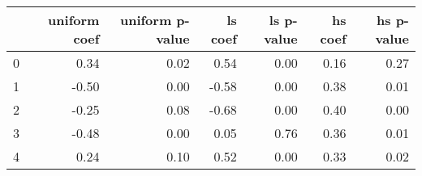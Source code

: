 \begin{tabular}{lrrrrrr}
\toprule
 & uniform coef & uniform p-value & ls coef & ls p-value & hs coef & hs p-value \\
\midrule
0 & 0.34 & 0.02 & 0.54 & 0.00 & 0.16 & 0.27 \\
1 & -0.50 & 0.00 & -0.58 & 0.00 & 0.38 & 0.01 \\
2 & -0.25 & 0.08 & -0.68 & 0.00 & 0.40 & 0.00 \\
3 & -0.48 & 0.00 & 0.05 & 0.76 & 0.36 & 0.01 \\
4 & 0.24 & 0.10 & 0.52 & 0.00 & 0.33 & 0.02 \\
\bottomrule
\end{tabular}
